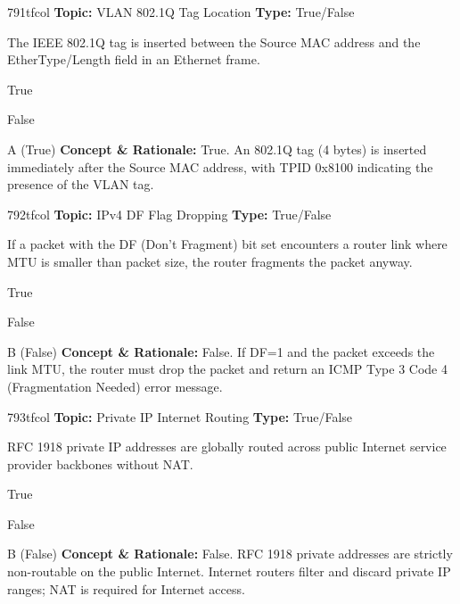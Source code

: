 \begin{qcard}{791}{tfcol}
\textcolor{darkslate!75}{\small\textbf{Topic:} VLAN 802.1Q Tag Location \hfill \textbf{Type:} True/False}\vspace{0.4em}\par
The IEEE 802.1Q tag is inserted between the Source MAC address and the EtherType/Length field in an Ethernet frame.
\begin{qoptions}
\item True
\item False
\end{qoptions}
\end{qcard}
\nopagebreak
\begin{explainbox}{A (True)}
\textbf{Concept \& Rationale:} True. An 802.1Q tag (4 bytes) is inserted immediately after the Source MAC address, with TPID 0x8100 indicating the presence of the VLAN tag.
\end{explainbox}

\begin{qcard}{792}{tfcol}
\textcolor{darkslate!75}{\small\textbf{Topic:} IPv4 DF Flag Dropping \hfill \textbf{Type:} True/False}\vspace{0.4em}\par
If a packet with the DF (Don't Fragment) bit set encounters a router link where MTU is smaller than packet size, the router fragments the packet anyway.
\begin{qoptions}
\item True
\item False
\end{qoptions}
\end{qcard}
\nopagebreak
\begin{explainbox}{B (False)}
\textbf{Concept \& Rationale:} False. If DF=1 and the packet exceeds the link MTU, the router must drop the packet and return an ICMP Type 3 Code 4 (Fragmentation Needed) error message.
\end{explainbox}

\begin{qcard}{793}{tfcol}
\textcolor{darkslate!75}{\small\textbf{Topic:} Private IP Internet Routing \hfill \textbf{Type:} True/False}\vspace{0.4em}\par
RFC 1918 private IP addresses are globally routed across public Internet service provider backbones without NAT.
\begin{qoptions}
\item True
\item False
\end{qoptions}
\end{qcard}
\nopagebreak
\begin{explainbox}{B (False)}
\textbf{Concept \& Rationale:} False. RFC 1918 private addresses are strictly non-routable on the public Internet. Internet routers filter and discard private IP ranges; NAT is required for Internet access.
\end{explainbox}

